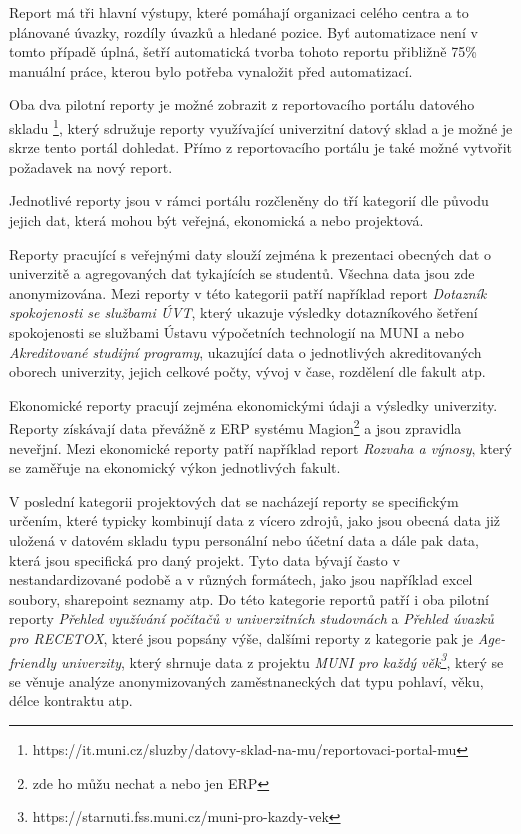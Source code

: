 \documentclass[
  digital,     %
  twoside,     %
  lof,         %
  lot,         %
]{fithesis4}
\begin{document}
Report má tři hlavní výstupy, které pomáhají organizaci celého centra a to plánované úvazky, rozdíly úvazků a hledané pozice. Byť automatizace není v tomto případě úplná, šetří automatická tvorba tohoto reportu přibližně 75\% manuální práce, kterou bylo potřeba vynaložit před automatizací.

Oba dva pilotní reporty je možné zobrazit z reportovacího portálu datového skladu \footnote{https://it.muni.cz/sluzby/datovy-sklad-na-mu/reportovaci-portal-mu}, který sdružuje reporty využívající univerzitní datový sklad a je možné je skrze tento portál dohledat. Přímo z reportovacího portálu je také možné vytvořit požadavek na nový report.

Jednotlivé reporty jsou v rámci portálu rozčleněny do tří kategorií dle původu jejich dat, která mohou být veřejná, ekonomická a nebo projektová. 

Reporty pracující s veřejnými daty slouží zejména k prezentaci obecných dat o univerzitě a agregovaných dat tykajících se studentů. Všechna data jsou zde anonymizována. Mezi reporty v této kategorii patří například report \emph{Dotazník spokojenosti se službami ÚVT}, který ukazuje výsledky dotazníkového šetření spokojenosti se službami Ústavu výpočetních technologií na MUNI a nebo \emph{Akreditované studijní programy}, ukazující data o jednotlivých akreditovaných oborech univerzity, jejich celkové počty, vývoj v čase, rozdělení dle fakult atp.

Ekonomické reporty pracují zejména ekonomickými údaji a výsledky univerzity. Reporty získávají data převážně z ERP systému Magion\footnote{zde ho můžu nechat a nebo jen ERP} a jsou zpravidla neveřjní. Mezi ekonomické reporty patří například report \emph{Rozvaha a výnosy}, který se zaměřuje na ekonomický výkon jednotlivých fakult.

V poslední kategorii projektových dat se nacházejí reporty se specifickým určením, které typicky kombinují data z vícero zdrojů, jako jsou obecná data již uložená v datovém skladu typu personální nebo účetní data a dále pak data, která jsou specifická pro daný projekt. Tyto data bývají často v nestandardizované podobě a v různých formátech, jako jsou například excel soubory, sharepoint seznamy atp. Do této kategorie reportů patří i oba pilotní reporty \emph{Přehled využívání počítačů v univerzitních studovnách} a \emph{Přehled úvazků pro RECETOX}, které jsou popsány výše, dalšími reporty z kategorie pak je \emph{Age-friendly univerzity}, který shrnuje data z projektu \emph{MUNI pro každý věk\footnote{https://starnuti.fss.muni.cz/muni-pro-kazdy-vek}}, který se se věnuje analýze anonymizovaných zaměstnaneckých dat typu pohlaví, věku, délce kontraktu atp.
\end{document}
